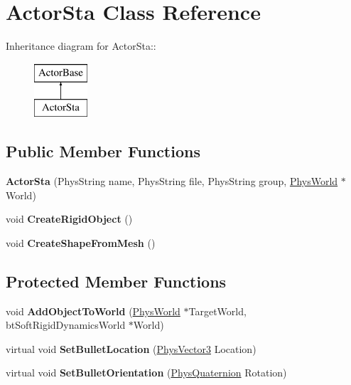 \hypertarget{classActorSta}{
\section{ActorSta Class Reference}
\label{d3/daf/classActorSta}
}
Inheritance diagram for ActorSta::\begin{figure}[H]
\begin{center}
\leavevmode
\includegraphics[height=2cm]{d3/daf/classActorSta}
\end{center}
\end{figure}
\subsection*{Public Member Functions}
\begin{DoxyCompactItemize}
\item 
\hypertarget{classActorSta_a00185fe588416c236f491b65f16dd145}{
{\bfseries ActorSta} (PhysString name, PhysString file, PhysString group, \hyperlink{classPhysWorld}{PhysWorld} $\ast$World)}
\label{d3/daf/classActorSta_a00185fe588416c236f491b65f16dd145}

\item 
\hypertarget{classActorSta_ae856b69de748541606649d21d2e6c270}{
void {\bfseries CreateRigidObject} ()}
\label{d3/daf/classActorSta_ae856b69de748541606649d21d2e6c270}

\item 
\hypertarget{classActorSta_a12e78aa21e50e6964330e25affa421c9}{
void {\bfseries CreateShapeFromMesh} ()}
\label{d3/daf/classActorSta_a12e78aa21e50e6964330e25affa421c9}

\end{DoxyCompactItemize}
\subsection*{Protected Member Functions}
\begin{DoxyCompactItemize}
\item 
\hypertarget{classActorSta_acd11f1ee404ab71d49d8fd4a810f2931}{
void {\bfseries AddObjectToWorld} (\hyperlink{classPhysWorld}{PhysWorld} $\ast$TargetWorld, btSoftRigidDynamicsWorld $\ast$World)}
\label{d3/daf/classActorSta_acd11f1ee404ab71d49d8fd4a810f2931}

\item 
\hypertarget{classActorSta_a472768e39d3ac67f35b9f74e5a679b99}{
virtual void {\bfseries SetBulletLocation} (\hyperlink{classPhysVector3}{PhysVector3} Location)}
\label{d3/daf/classActorSta_a472768e39d3ac67f35b9f74e5a679b99}

\item 
\hypertarget{classActorSta_ab038b2ce4e25fa3441e9b081cef7879e}{
virtual void {\bfseries SetBulletOrientation} (\hyperlink{classPhysQuaternion}{PhysQuaternion} Rotation)}
\label{d3/daf/classActorSta_ab038b2ce4e25fa3441e9b081cef7879e}

\end{DoxyCompactItemize}
